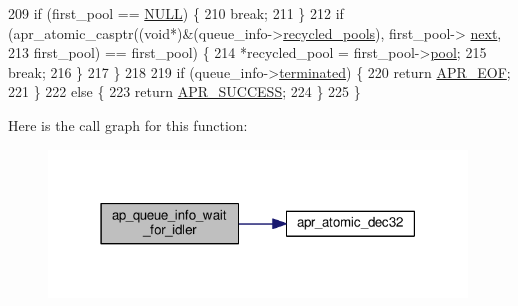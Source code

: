 \begin{DoxyCode}
209         \textcolor{keywordflow}{if} (first\_pool == \hyperlink{pcre_8txt_ad7f989d16aa8ca809a36bc392c07fba1}{NULL}) \{
210             \textcolor{keywordflow}{break};
211         \}
212         \textcolor{keywordflow}{if} (apr\_atomic\_casptr((\textcolor{keywordtype}{void}*)&(queue\_info->\hyperlink{structfd__queue__info__t_ac4e7511417ba04c774bf0576cba54dc2}{recycled\_pools}), first\_pool->
      \hyperlink{structrecycled__pool_a6c607a84f541b580419d94ec5313c25a}{next},
213                               first\_pool) == first\_pool) \{
214             *recycled\_pool = first\_pool->\hyperlink{structrecycled__pool_a7a9db88b8ae2ec367708d457b29e7d22}{pool};
215             \textcolor{keywordflow}{break};
216         \}
217     \}
218 
219     \textcolor{keywordflow}{if} (queue\_info->\hyperlink{structfd__queue__info__t_ab3c2c38658e83a417f7d6d98ed021d87}{terminated}) \{
220         \textcolor{keywordflow}{return} \hyperlink{group__APR__Error_ga35d9dca2514c522a2840aca0f3e2ebd3}{APR\_EOF};
221     \}
222     \textcolor{keywordflow}{else} \{
223         \textcolor{keywordflow}{return} \hyperlink{group__apr__errno_ga9ee311b7bf1c691dc521d721339ee2a6}{APR\_SUCCESS};
224     \}
225 \}
\end{DoxyCode}


Here is the call graph for this function\+:
\nopagebreak
\begin{figure}[H]
\begin{center}
\leavevmode
\includegraphics[width=315pt]{group__APACHE__MPM__WORKER_ga7e0fa1c1b5681b774ad15366f909e55b_cgraph}
\end{center}
\end{figure}


